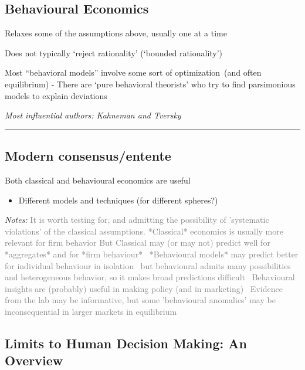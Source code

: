 \documentclass[]{article}
\providecommand{\tightlist}{%
  \setlength{\itemsep}{0pt}\setlength{\parskip}{0pt}}
\begin{document}
\hypertarget{behavioural-economics}{%
\subsection{Behavioural Economics}\label{behavioural-economics}}

Relaxes some of the assumptions above, usually one at a time

\bigskip

Does not typically `reject rationality' (`bounded rationality')

\bigskip

Most ``behavioral models'' involve some sort of optimization~(and often
equilibrium) - There are `pure behavioral theorists' who try to find
parsimonious models to explain deviations

\emph{Most influential authors: Kahneman and Tversky}

\begin{center}\rule{0.5\linewidth}{\linethickness}\end{center}

\hypertarget{modern-consensusentente}{%
\subsection{Modern consensus/entente}\label{modern-consensusentente}}

Both classical and behavioural economics are useful

\begin{itemize}
\tightlist
\item
  Different models and techniques (for different spheres?)
\end{itemize}

\emph{Notes:}
\textcolor{gray}{It is worth testing for, and admitting the possibility of 'systematic violations' of the classical assumptions.
*Classical* economics is usually more relevant for firm behavior
But Classical may (or may not) predict well for *aggregates* and for *firm behaviour* \
*Behavioural models* may predict better for individual behaviour in isolation \
but behavioural admits many possibilities and heterogeneous behavior, so it makes broad predictions difficult \
Behavioural insights are (probably) useful in making policy (and in marketing) \
Evidence from the lab may be informative, but some 'behavioural anomalies' may be inconsequential in larger markets in equilibrium}

\hypertarget{limits-to-human-decision-making-an-overview}{%
\subsection{Limits to Human Decision Making: An
Overview}\label{limits-to-human-decision-making-an-overview}}
\end{document}
